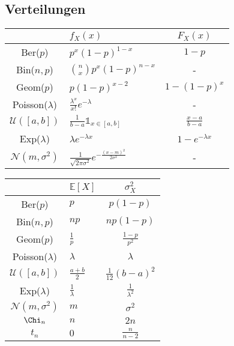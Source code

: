 \documentclass[a4paper,10pt]{article}
\def\E{\mathbb{E}}
\begin{document}
\subsection{Verteilungen}

\newcommand{\uniformpdf}{%
\frac{1}{b-a}\mathbb{1}_{x\in[a,b]}
}

\newcommand{\binompdf}{%
    \binom{n}{x}p^x(1-p)^{n-x}
}

\newcommand{\normalpdf}{%
    \frac{1}{\sqrt{2\pi\sigma^2}} e^{-\frac{(x-m)^2}{2\sigma^2}}
}
\begin{tabularx}{\linewidth}{c>{\centering\arraybackslash}Xc}
                           & \(f_X(x)\)               & \(F_X(x)\)          \\
    \toprule
    Ber(\(p\))             & \(p^x(1-p)^{1-x}\)       & \(1-p\)             \\
    Bin(\(n,p\))           & \(\binompdf\)            & -                   \\
    Geom(\(p\))            & \(p(1-p)^{x-2}\)         & \(1-(1-p)^x\)       \\
    Poisson(\(λ\))         & \(\frac{λ^x}{x!}e^{-λ}\) & -                   \\
    \(\mathcal{U}([a,b])\) & \(\uniformpdf\)          & \(\frac{x-a}{b-a}\) \\
    Exp(\(\lambda\))       & \(λe^{-λx}\)             & \(1-e^{-λx}\)       \\
    \(\mathcal{N}(m,σ^2)\) & \(\normalpdf\)           & -                   \\
    \bottomrule
\end{tabularx}

\begin{center}
    \begin{tabularx}{\linewidth}{c>{\centering\arraybackslash}Xc}
                               & \(\E[X]\)         & \(\sigma^2_X\)          \\
        \toprule
        Ber(\(p\))             & \(p\)             & \(p(1-p)\)              \\
        Bin(\(n,p\))           & \(np\)            & \(np(1-p)\)             \\
        Geom(\(p\))            & \(\frac{1}{p}\)   & \(\frac{1-p}{p^2}\)     \\
        Poisson(\(λ\))         & \(λ\)             & \(\lambda\)             \\
        \(\mathcal{U}([a,b])\) & \(\frac{a+b}{2}\) & \(\frac{1}{12}(b-a)^2\) \\
        Exp(\(\lambda\))       & \(\frac{1}{λ}\)   & \(\frac{1}{\lambda^2}\) \\
        \(\mathcal{N}(m,σ^2)\) & \(m\)             & \(\sigma^2\)            \\
        \(\Chi_n\)             & \(n\)             & \(2n\)                  \\
        \(t_n\)                & \(0\)             & \(\frac{n}{n-2}\)       \\
        \bottomrule
    \end{tabularx}
\end{center}
\end{document}
